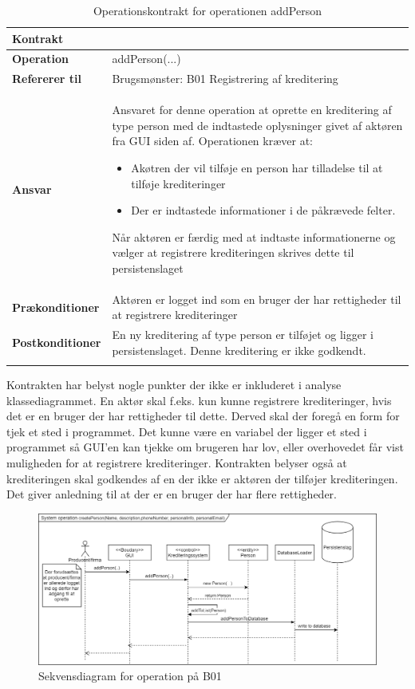 \begin{longtable}[H]{|p{35mm}|p{115mm}|}
\hline
\textbf{Kontrakt} &  \\ \hline
        \textbf{Operation} & addPerson(...) \\ \hline
        \textbf{Refererer til} & Brugsmønster: B01 Registrering af kreditering \\ \hline
        \textbf{Ansvar} & Ansvaret for denne operation at oprette en kreditering af type person med de indtastede oplysninger givet af aktøren fra GUI siden af. Operationen kræver at:
        \begin{itemize}
        \item Akøtren der vil tilføje en person har tilladelse til at tilføje krediteringer
        \item Der er indtastede informationer i de påkrævede felter. 
        \end{itemize}
        Når aktøren er færdig med at indtaste informationerne og vælger at registrere krediteringen skrives dette til persistenslaget
        \\ \hline
        \textbf{Prækonditioner} & Aktøren er logget ind som en bruger der har rettigheder til at registrere krediteringer\\ \hline
        \textbf{Postkonditioner} &
        En ny kreditering af type person er tilføjet og ligger i persistenslaget. Denne kreditering er ikke godkendt.\\ \hline
\caption{Operationskontrakt for operationen addPerson}
    
\end{longtable}

Kontrakten har belyst nogle punkter der ikke er inkluderet i analyse klassediagrammet. En aktør skal f.eks. kun kunne registrere krediteringer, hvis det er en bruger der har rettigheder til dette. Derved skal der foregå en form for tjek et sted i programmet. Det kunne være en variabel der ligger et sted i programmet så GUI'en kan tjekke om brugeren har lov, eller overhovedet får vist muligheden for at registrere krediteringer. Kontrakten belyser også at krediteringen skal godkendes af en der ikke er aktøren der tilføjer krediteringen. Det giver anledning til at der er en bruger der har flere rettigheder.
 
\begin{figure}[H]
    \centering
    \includegraphics[scale = 0.37]{images/B01OSD.png}
    \caption{Sekvensdiagram for operation på B01}
    \label{fig:OperationsSekvensDiagramB01}
\end{figure}

